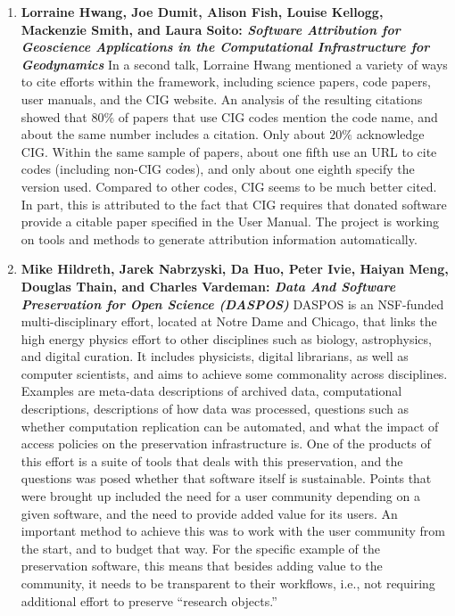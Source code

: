 \documentclass[11pt, oneside]{amsart}
\begin{document}
\begin{enumerate}
\item \textbf{Lorraine Hwang, Joe Dumit, Alison Fish, Louise Kellogg, Mackenzie
Smith, and Laura Soito: \textit{Software Attribution for Geoscience Applications
in the Computational Infrastructure for Geodynamics}} In a second talk, Lorraine
Hwang mentioned a variety of ways to cite efforts within the framework, including
science papers, code papers, user manuals, and the CIG website. An analysis of
the resulting citations showed that $80\%$ of papers that use CIG codes mention
the code name, and about the same number includes a citation. Only about $20\%$
acknowledge CIG. Within the same sample of papers, about one fifth use an URL to
cite codes (including non-CIG codes), and only about one eighth specify the
version used. Compared to other codes, CIG seems to be much better cited. In
part, this is attributed to the fact that CIG requires that donated software
provide a citable paper specified in the User Manual. The project is working on
tools and methods to generate attribution information automatically.

\item \textbf{Mike Hildreth, Jarek Nabrzyski, Da Huo, Peter Ivie, Haiyan Meng,
Douglas Thain, and Charles Vardeman: \textit{Data And Software Preservation for
Open Science (DASPOS)}} DASPOS is an NSF-funded multi-disciplinary effort,
located at Notre Dame and Chicago, that links the high energy physics effort to
other disciplines such as biology, astrophysics, and digital curation. It includes
physicists, digital librarians, as well as computer scientists, and aims to
achieve some commonality across disciplines. Examples are meta-data descriptions
of archived data, computational descriptions, descriptions of how data was
processed, questions such as whether computation replication can be automated,
and what the impact of access policies on the preservation infrastructure is.
One of the products of this effort is a suite of tools that deals with this
preservation, and the questions was posed whether that software itself is
sustainable. Points that were brought up included the need for a user community
depending on a given software, and the need to provide added value for its
users. An important method to achieve this was to work with the user community
from the start, and to budget that way. For the specific example of the
preservation software, this means that besides adding value to the community, it
needs to be transparent to their workflows, i.e., not requiring additional
effort to preserve ``research objects.''


\end{enumerate}
\end{document}
